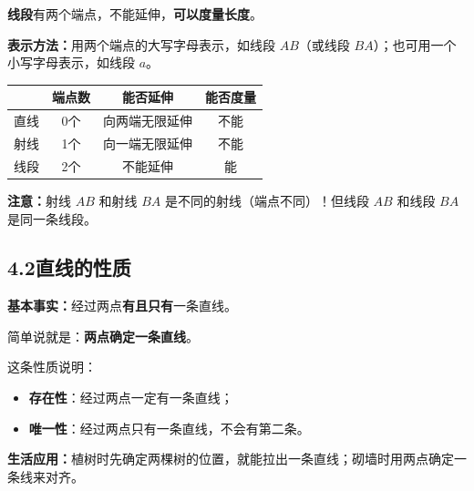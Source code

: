 \documentclass[12pt, a4paper]{ctexart}
\begin{document}
\begin{knowledgebox}[线段]
\textbf{线段}有两个端点，不能延伸，\textbf{可以度量长度}。

\textbf{表示方法：}用两个端点的大写字母表示，如线段 $AB$（或线段 $BA$）；也可用一个小写字母表示，如线段 $a$。

\begin{center}
\end{center}
\end{knowledgebox}

\begin{warnbox}[直线、射线、线段的区别]
\begin{center}
\renewcommand{\arraystretch}{1.3}
\begin{tabular}{|c|c|c|c|}
\hline
 & \textbf{端点数} & \textbf{能否延伸} & \textbf{能否度量} \\
\hline
直线 & 0个 & 向两端无限延伸 & 不能 \\
\hline
射线 & 1个 & 向一端无限延伸 & 不能 \\
\hline
线段 & 2个 & 不能延伸 & 能 \\
\hline
\end{tabular}
\end{center}
\textbf{注意：}射线 $AB$ 和射线 $BA$ 是不同的射线（端点不同）！但线段 $AB$ 和线段 $BA$ 是同一条线段。
\end{warnbox}

\subsection*{4.2\quad 直线的性质}

\begin{knowledgebox}[两点确定一条直线]
\textbf{基本事实：}经过两点\textbf{有且只有}一条直线。

简单说就是：\textbf{两点确定一条直线}。

这条性质说明：
\begin{itemize}[nosep]
  \item \textbf{存在性}：经过两点一定有一条直线；
  \item \textbf{唯一性}：经过两点只有一条直线，不会有第二条。
\end{itemize}

\textbf{生活应用：}植树时先确定两棵树的位置，就能拉出一条直线；砌墙时用两点确定一条线来对齐。
\end{knowledgebox}
\end{document}
